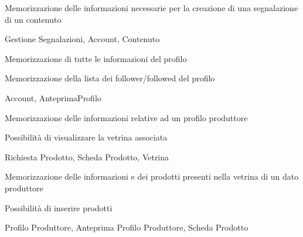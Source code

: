
{\begin{itemWork}
	\item Memorizzazione delle informazioni necessarie per la creazione di una segnalazione di un contenuto
\end{itemWork}}
{\begin{itemWork}
	\item Gestione Segnalazioni, Account, Contenuto
\end{itemWork}}


{\begin{itemWork}
	\item Memorizzazione di tutte le informazioni del profilo
	\item Memorizzazione della lista dei follower/followed del profilo
\end{itemWork}}
{\begin{itemWork}
	\item Account, AnteprimaProfilo
\end{itemWork}}


{\begin{itemWork}
	\item Memorizzazione delle informazioni relative ad un profilo produttore
	\item Possibilità di visualizzare la vetrina associata
\end{itemWork}}
{\begin{itemWork}
	\item Richiesta Prodotto, Scheda Prodotto, Vetrina
\end{itemWork}}


{\begin{itemWork}
    \item Memorizzazione delle informazioni e dei prodotti presenti nella vetrina di un dato produttore
	\item Possibilità di inserire prodotti
\end{itemWork}}
{\begin{itemWork}
	\item Profilo Produttore, Anteprima Profilo Produttore, Scheda Prodotto
\end{itemWork}}


